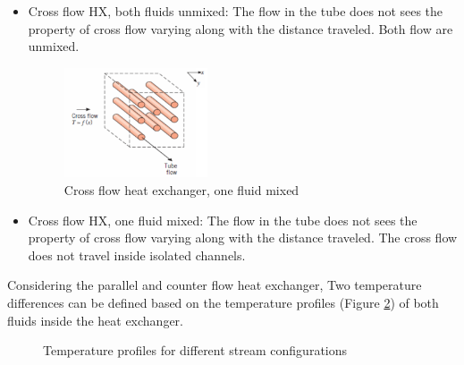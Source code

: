\begin{itemize}
\item Cross flow HX, both fluids unmixed: The flow in the tube does not sees the property of cross flow varying along with the distance traveled. Both flow are unmixed.
\newpage
\begin{figure}[h]
\centering
\includegraphics[width=0.4\textwidth]{crossed_flow_one_mixed}
\caption{Cross flow heat exchanger, one fluid mixed \citep{Ngendakumana2018}}
\label{fig:C3_cross_flow_1mixed}
\end{figure}

\item Cross flow HX, one fluid mixed: The flow in the tube does not sees the property of cross flow varying along with the distance traveled. The cross flow does not travel inside isolated channels.
\end{itemize}

Considering the parallel and counter flow heat exchanger, Two temperature differences can be defined based on the temperature profiles (Figure \ref{fig:C3_Tprof}) of both fluids inside the heat exchanger.

\begin{figure}[h]
\centering
{}\hfill
{}\caption{Temperature profiles for different stream configurations}\label{fig:C3_Tprof}
\end{figure}

